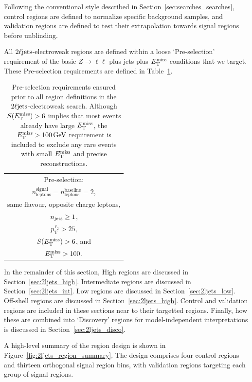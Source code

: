 Following the conventional style described in
Section~\ref{sec:searches_searches},
control regions are defined to normalize specific background samples,
and validation regions are defined to test their extrapolation towards
signal regions before unblinding.

All $\twoljets$-electroweak regions are defined within a loose `Pre-selection'
requirement of the basic $Z\to \ell\ell$ plus jets plus $\met$
conditions that we target.
These Pre-selection requirements are defined in Table~\ref{tab:2ljets_presel}.

\begin{table}[tp]
\centering
\begin{tabular}{c}
Pre-selection:
\\[1em]
$n_\mathrm{leptons}^\mathrm{signal} = n_\mathrm{leptons}^\mathrm{baseline} = 2$,
\\[0.5em]
same flavour, opposite charge leptons,
\\[0.5em]
$\njet \geq 1$,
\\[0.5em]
$p_\mathrm{T}^{\,\ell_2} > 25$,
\\[0.5em]
\hphantom{~and}$\metsig > 6$, and
\\[0.5em]
$\met > 100$.
\end{tabular}
\caption[%
Pre-selection requirements ensured prior to all region definitions in the
$\twoljets$-electroweak search
]{%
Pre-selection requirements ensured prior to all region definitions in the
$\twoljets$-electroweak search.
Although $\metsig > 6$ implies that most events already have large $\met$, the
$\met > 100\,\eV[G]$ requirement is included to exclude any rare events with
small $\met$ and precise reconstructions.
}
\label{tab:2ljets_presel}
\end{table}

In the remainder of this section,
High regions are discussed in Section~\ref{sec:2ljets_high}.
Intermediate regions are discussed in Section~\ref{sec:2ljets_int}.
Low regions are discussed in Section~\ref{sec:2ljets_low}.
Off-shell regions are discussed in Section~\ref{sec:2ljets_high}.
Control and validation regions are included in these sections near to their
targetted regions.
Finally, how these are combined into `Discovery' regions for
model-independent interpretations is discussed in
Section~\ref{sec:2ljets_disco}.

A high-level summary of the region design is shown in
Figure~\ref{fig:2ljets_region_summary}.
The design comprises four control regions and thirteen orthogonal signal region
bins, with validation regions targeting each group of signal regions.

